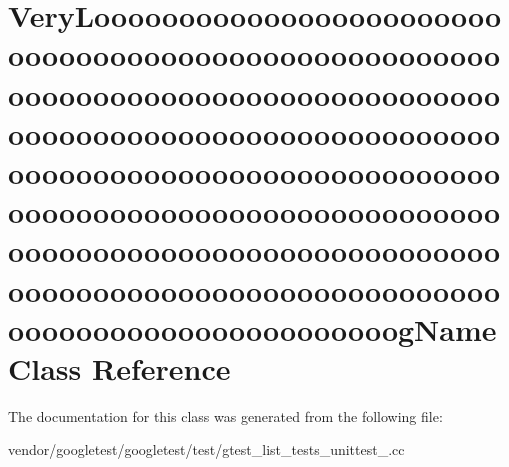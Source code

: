 \hypertarget{class_very_loooooooooooooooooooooooooooooooooooooooooooooooooooooooooooooooooooooooooooooooooooo570db76e21fa868abfe0f6323a68c9ba}{}\section{Very\+Loooooooooooooooooooooooooooooooooooooooooooooooooooooooooooooooooooooooooooooooooooooooooooooooooooooooooooooooooooooooooooooooooooooooooooooooooooooooooooooooooooooooooooooooooooooooooooooooooooooooooooooooooooooooooooooooooooooooooooooooooooooooooog\+Name Class Reference}
\label{class_very_loooooooooooooooooooooooooooooooooooooooooooooooooooooooooooooooooooooooooooooooooooo570db76e21fa868abfe0f6323a68c9ba}


The documentation for this class was generated from the following file\+:\begin{DoxyCompactItemize}
\item 
vendor/googletest/googletest/test/gtest\+\_\+list\+\_\+tests\+\_\+unittest\+\_\+.\+cc\end{DoxyCompactItemize}
